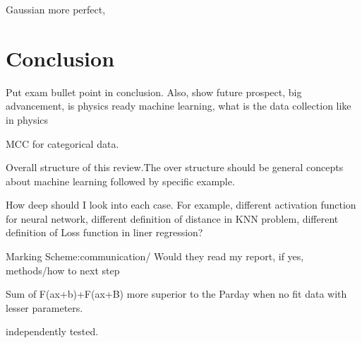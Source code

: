 \documentclass[12pt,a4paper]{article}
\begin{document}
Gaussian more perfect,

\section{Conclusion}
Put exam bullet point in conclusion.
Also, show future prospect, big advancement, is physics ready machine learning, what is the data collection like in physics

MCC for categorical data.
\begin{example}
    {Overall structure of this review.}{The over structure should be general concepts about machine learning followed by specific example.}
\end{example}
\begin{example}
    {How deep should I look into each case. For example, different activation function for neural network, different definition of distance in KNN problem, different definition of Loss function in liner regression?}{}
\end{example}
\begin{example}
    {Marking Scheme:}{communication/ Would they read my report, if yes, methods/how to next step}
\end{example}


Sum of F(ax+b)+F(ax+B) more superior to the Parday when no fit data with lesser parameters.




independently tested.
\end{document}
